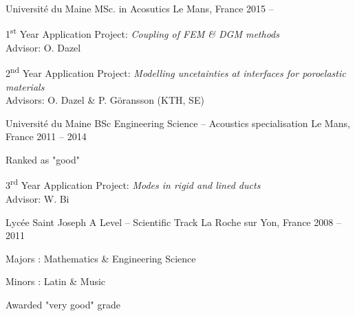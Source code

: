 

\begin{cventries}

  \cventry
    {Université du Maine} %
		{MSc. in Acosutics} %
    {Le Mans, France} %
    {2015 -- } %
    {
      \begin{cvitems} %
				\item {1\textsuperscript{st} Year Application Project: \textit{Coupling of FEM \& DGM methods}\\
					Advisor: O. Dazel}
				\item {2\textsuperscript{nd} Year Application Project: \textit{Modelling uncetainties at interfaces for poroelastic materials}
					\\Advisors: O. Dazel \& P. Göransson (KTH, SE)}
      \end{cvitems}
    }

  \cventry
    {Université du Maine} %
		{BSc Engineering Science -- Acoustics specialisation} %
    {Le Mans, France} %
    {2011 -- 2014} %
    {
      \begin{cvitems} %
        \item {Ranked as "good"}
				\item {3\textsuperscript{rd} Year Application Project: \textit{Modes in rigid and lined ducts}
					\\Advisor: W. Bi}
      \end{cvitems}
    }

  \cventry
    {Lycée Saint Joseph} %
		{A Level -- Scientific Track} %
    {La Roche sur Yon, France} %
    {2008 -- 2011} %
    {
      \begin{cvitems} %
				\item {Majors : Mathematics \& Engineering Science}
				\item {Minors : Latin \& Music}
        \item {Awarded "very good" grade}
      \end{cvitems}
    }
\end{cventries}
